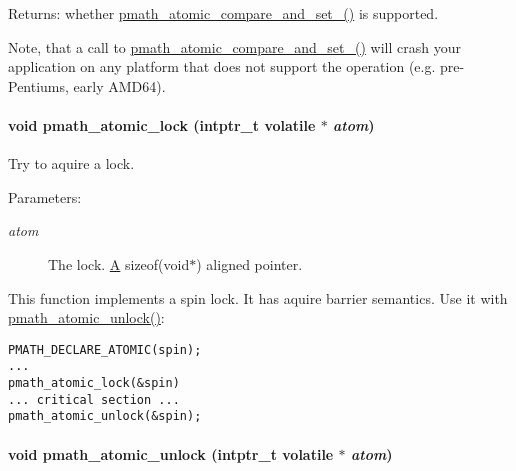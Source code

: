 \begin{Desc}
\item[Returns:]whether \hyperlink{group__atomic__ops_g868adc2a74d7aafbb0670922f61a21cc}{pmath\_\-atomic\_\-compare\_\-and\_\-set\_()} is supported.\end{Desc}
Note, that a call to \hyperlink{group__atomic__ops_g868adc2a74d7aafbb0670922f61a21cc}{pmath\_\-atomic\_\-compare\_\-and\_\-set\_()} will crash your application on any platform that does not support the operation (e.g. pre-Pentiums, early AMD64). \hypertarget{group__atomic__ops_gf143a22332da6a2065bac14069ecbf7f}{
\paragraph[{pmath\_\-atomic\_\-lock}]{\setlength{\rightskip}{0pt plus 5cm}void pmath\_\-atomic\_\-lock (intptr\_\-t volatile $\ast$ {\em atom})}\hfill}
\label{group__atomic__ops_gf143a22332da6a2065bac14069ecbf7f}


Try to aquire a lock. 

\begin{Desc}
\item[Parameters:]
\begin{description}
\item[{\em atom}]The lock. \hyperlink{class_a}{A} sizeof(void$\ast$) aligned pointer.\end{description}
\end{Desc}
This function implements a spin lock. It has aquire barrier semantics. Use it with \hyperlink{group__atomic__ops_ga61bbbab4adc550cc66d1d5f9cf22afd}{pmath\_\-atomic\_\-unlock()}: 

\begin{Code}\begin{verbatim}PMATH_DECLARE_ATOMIC(spin);
...
pmath_atomic_lock(&spin)
... critical section ...
pmath_atomic_unlock(&spin);
\end{verbatim}
\end{Code}

 \hypertarget{group__atomic__ops_ga61bbbab4adc550cc66d1d5f9cf22afd}{
\paragraph[{pmath\_\-atomic\_\-unlock}]{\setlength{\rightskip}{0pt plus 5cm}void pmath\_\-atomic\_\-unlock (intptr\_\-t volatile $\ast$ {\em atom})}\hfill}
\label{group__atomic__ops_ga61bbbab4adc550cc66d1d5f9cf22afd}


